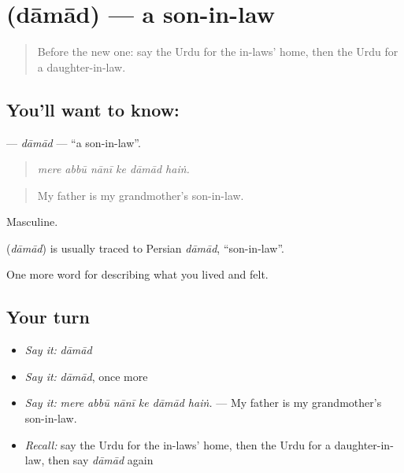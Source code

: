 \section[\texorpdfstring{\ur{داماد} (dāmād)}{داماد (dāmād)}]{ (dāmād) — a son-in-law}

\label{lesson:UR-C488-damad}



\begin{quote}
Before the new one: say the Urdu for the in-laws' home, then the Urdu for a daughter-in-law.
\end{quote}

\subsection*{You'll want to know: }
\textbf{} — \emph{dāmād} — \textquotedblleft{}a son-in-law\textquotedblright{}.

\begin{quote}
     
\end{quote}

\begin{quote}
\emph{mere abbū nānī ke dāmād haiṅ.}
\end{quote}

\begin{quote}
My father is my grandmother's son-in-law.
\end{quote}

Masculine.

\begin{cousinweb}
\textbf{} (\emph{dāmād}) is usually traced to Persian \emph{dāmād}, \textquotedblleft{}son-in-law\textquotedblright{}.
\end{cousinweb}

\begin{grammarlens}[title={What you've built}]
One more word for describing what you lived and felt.
\end{grammarlens}

\subsection*{Your turn}
\begin{itemize}
\raggedright
  \item \emph{Say it:} \emph{dāmād}
  \item \emph{Say it:} \emph{dāmād}, once more
  \item \emph{Say it:} \emph{mere abbū nānī ke dāmād haiṅ.} — My father is my grandmother's son-in-law.
  \item \emph{Recall:} say the Urdu for the in-laws' home, then the Urdu for a daughter-in-law, then say \emph{dāmād} again
\end{itemize}


